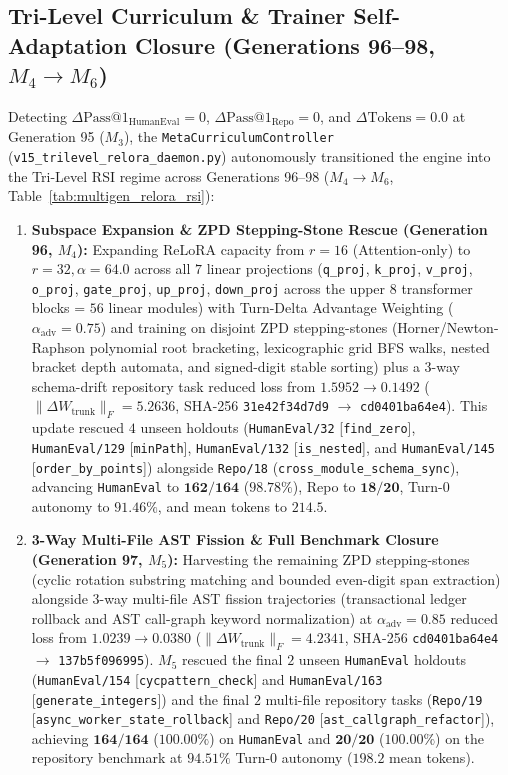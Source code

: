 \documentclass[10pt,twocolumn,letterpaper]{article}
\begin{document}
\subsection{Tri-Level Curriculum \& Trainer Self-Adaptation Closure (Generations 96--98, $M_{4}\to M_{6}$)}
\label{subsec:v15_trilevel_closure}
Detecting $\Delta\text{Pass@1}_{\text{HumanEval}}=0$, $\Delta\text{Pass@1}_{\text{Repo}}=0$, and $\Delta\text{Tokens}=0.0$ at Generation 95 ($M_{3}$), the \texttt{MetaCurriculumController} (\texttt{v15\_\allowbreak trilevel\_\allowbreak relora\_\allowbreak daemon.py}) autonomously transitioned the engine into the Tri-Level RSI regime across Generations 96--98 ($M_{4}\to M_{6}$, Table~\ref{tab:multigen_relora_rsi}):
\begin{enumerate}
    \item \textbf{Subspace Expansion \& ZPD Stepping-Stone Rescue (Generation 96, $M_{4}$):} Expanding ReLoRA capacity from $r=16$ (Attention-only) to $r=32, \alpha=64.0$ across all $7$ linear projections (\texttt{q\_proj}, \texttt{k\_proj}, \texttt{v\_proj}, \texttt{o\_proj}, \texttt{gate\_proj}, \texttt{up\_proj}, \texttt{down\_proj} across the upper $8$ transformer blocks = $56$ linear modules) with Turn-Delta Advantage Weighting ($\alpha_{\text{adv}}=0.75$) and training on disjoint ZPD stepping-stones (Horner/Newton-Raphson polynomial root bracketing, lexicographic grid BFS walks, nested bracket depth automata, and signed-digit stable sorting) plus a 3-way schema-drift repository task reduced loss from $1.5952\to 0.1492$ ($\|\Delta W_{\text{trunk}}\|_{F}=5.2636$, SHA-256 \texttt{31e42f34d7d9} $\to$ \texttt{cd0401ba64e4}). This update rescued $4$ unseen holdouts (\texttt{HumanEval/32} [\texttt{find\_zero}], \texttt{HumanEval/129} [\texttt{minPath}], \texttt{HumanEval/132} [\texttt{is\_nested}], and \texttt{HumanEval/145} [\texttt{order\_by\_points}]) alongside \texttt{Repo/18} (\texttt{cross\_module\_schema\_sync}), advancing \texttt{HumanEval} to $\mathbf{162/164}$ ($\mathbf{98.78\%}$), Repo to $\mathbf{18/20}$, Turn-0 autonomy to $\mathbf{91.46\%}$, and mean tokens to $\mathbf{214.5}$.
    \item \textbf{3-Way Multi-File AST Fission \& Full Benchmark Closure (Generation 97, $M_{5}$):} Harvesting the remaining ZPD stepping-stones (cyclic rotation substring matching and bounded even-digit span extraction) alongside 3-way multi-file AST fission trajectories (transactional ledger rollback and AST call-graph keyword normalization) at $\alpha_{\text{adv}}=0.85$ reduced loss from $1.0239\to 0.0380$ ($\|\Delta W_{\text{trunk}}\|_{F}=4.2341$, SHA-256 \texttt{cd0401ba64e4} $\to$ \texttt{137b5f096995}). $M_{5}$ rescued the final $2$ unseen \texttt{HumanEval} holdouts (\texttt{HumanEval/154} [\texttt{cycpattern\_check}] and \texttt{HumanEval/163} [\texttt{generate\_integers}]) and the final $2$ multi-file repository tasks (\texttt{Repo/19} [\texttt{async\_worker\_state\_rollback}] and \texttt{Repo/20} [\texttt{ast\_callgraph\_refactor}]), achieving $\mathbf{164/164}$ ($\mathbf{100.00\%}$) on \texttt{HumanEval} and $\mathbf{20/20}$ ($\mathbf{100.00\%}$) on the repository benchmark at $\mathbf{94.51\%}$ Turn-0 autonomy ($198.2$ mean tokens).

\end{enumerate}
\end{document}
